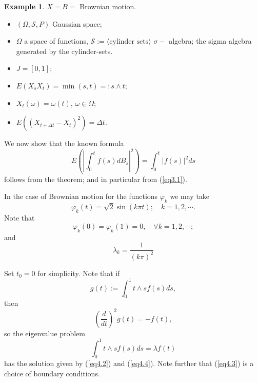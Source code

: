 \documentclass{amsart}
\theoremstyle{definition}
\newtheorem{example}[theorem]{Example}
\theoremstyle{remark}
\numberwithin{equation}{section}
\begin{document}
\begin{example}
\label{E:4.1}
  $X=B=$ Brownian motion.
  \begin{itemize}
    \item $(\Omega, \mathcal{S}, P)$ Gaussian space;
    \item $\Omega$ a space of functions, 
          $\mathcal{S}:=\langle \text{cylinder sets}\rangle$ 
          $\sigma-$ algebra; the sigma algebra generated by the cylinder-sets.
    \item $J=[0,1]$;
    \item $E(X_{s} X_{t})=\min(s, t)=:s \wedge t$;
    \item $X_{t}(\omega)=\omega(t)$, $\omega \in \Omega$; 
    \item $E((X_{t+\Delta t}-X_{t})^{2})=\Delta t$.
  \end{itemize}
  We now show that the known formula
  \begin{equation}
  
  \label{eq4.1}
    E(\left\vert \int_{0}^{t}f(s)dB_{s}\right\vert^{2})= 
    \int_{0}^{t}|f(s)|^{2}ds
  \end{equation}
  follows from the theorem; and in particular from (\ref{eq3.1}).
 
  In the case of Brownian motion for the functions $\varphi_{k}$ we may take 
  \begin{equation}
  
  \label{eq4.2}
    \varphi_{k}(t)=\sqrt{2}\sin(k\pi t); \quad k=1,2, \cdots . 
  \end{equation}
  Note that
  \begin{equation}
  
  \label{eq4.3}
    \varphi_{k}(0)=\varphi_{k}(1)=0, \quad \forall k=1,2, \cdots ;
  \end{equation}
  and 
  \begin{equation}
  
  \label{eq4.4}
    \lambda_{k}=\frac{1}{(k\pi)^{2}}
  \end{equation}

  Set $t_{0}=0$ for simplicity.  Note that if 
  \begin{equation}
  
  \label{eq4.5}
    g(t):= \int_{0}^{1} t \wedge s f(s)ds,
  \end{equation}
  then 
  \[
    (\frac{d}{dt})^{2}g(t)=-f(t),
  \]
  so the eigenvalue problem
  \begin{equation}
  
  \label{eq4.6}
    \int_{0}^{1}t \wedge s f(s)ds=\lambda f(t)
  \end{equation}
  has the solution given by (\ref{eq4.2}) and (\ref{eq4.4}).  Note further that 
  (\ref{eq4.3}) is a choice of boundary conditions.


\end{example}
\end{document}
